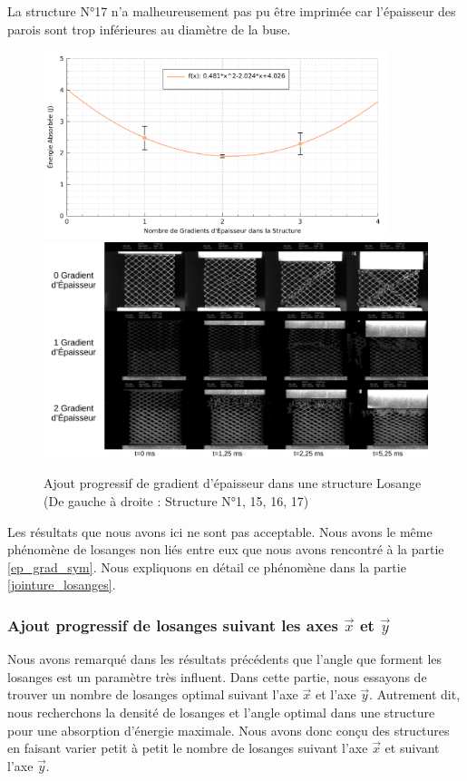 \documentclass[a4paper]{article}
\begin{document}
	La structure N°17 n'a malheureusement pas pu être imprimée car l'épaisseur des parois sont trop inférieures au diamètre de la buse.
	
	\begin{figure}[H]
		\centering
		\includegraphics[width=10cm]{Images/7/7_4/7_4_7/ajout_gradep_courbe.pdf}
		\includegraphics[width=16cm]{Images/7/7_4/7_4_7/instants.pdf}
		\caption{Ajout progressif de gradient d'épaisseur dans une structure Losange (De gauche à droite : Structure N°1, 15, 16, 17)}
	\end{figure}
	
	Les résultats que nous avons ici ne sont pas acceptable. Nous avons le même phénomène de losanges non liés entre eux que nous avons rencontré à la partie \ref{ep_grad_sym}. Nous expliquons en détail ce phénomène dans la partie \ref{jointure_losanges}.
	\newpage
	
	\subsubsection{Ajout progressif de losanges suivant les axes $\vec{x}$ et $\vec{y}$}
	\label{angle_densite_losange}
	\hspace{0.5cm}Nous avons remarqué dans les résultats précédents que l'angle que forment les losanges est un paramètre très influent. Dans cette partie, nous essayons de trouver un nombre de losanges optimal suivant l'axe $\vec{x}$ et l'axe $\vec{y}$. Autrement dit, nous recherchons la densité de losanges et l'angle optimal dans une structure pour une absorption d'énergie maximale. Nous avons donc conçu des structures en faisant varier petit à petit le nombre de losanges suivant l'axe $\vec{x}$ et suivant l'axe $\vec{y}$.\\
	
\end{document}
